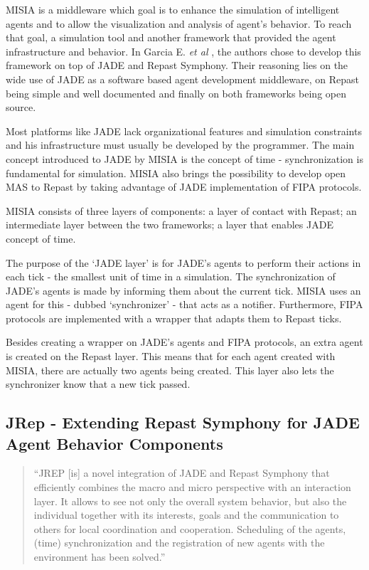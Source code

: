 	MISIA is a middleware which goal is to enhance the simulation of intelligent agents and to allow the visualization and analysis of agent's behavior. To reach that goal, a simulation tool and another framework that provided the agent infrastructure and behavior. In Garcia E. \textit{et al} \cite{garcia2011misia}, the authors chose to develop this framework on top of JADE and Repast Symphony. Their reasoning lies on the wide use of JADE as a software based agent development middleware, on Repast being simple and well documented and finally on both frameworks being open source.

	Most platforms like JADE lack organizational features and simulation constraints and his infrastructure must usually be developed by the programmer. The main concept introduced to JADE by MISIA is the concept of time - synchronization is fundamental for simulation. MISIA also brings the possibility to develop open MAS to Repast by taking advantage of JADE implementation of FIPA protocols.

	MISIA consists of three layers of components: a layer of contact with Repast; an intermediate layer between the two frameworks; a layer that enables JADE concept of time.

	The purpose of the `JADE layer' is for JADE's agents to perform their actions in each tick - the smallest unit of time in a simulation. The synchronization of JADE's agents is made by informing them about the current tick. MISIA uses an agent for this - dubbed `synchronizer' - that acts as a notifier. Furthermore, FIPA protocols are implemented with a wrapper that adapts them to Repast ticks.

	Besides creating a wrapper on JADE's agents and FIPA protocols, an extra agent is created on the Repast layer. This means that for each agent created with MISIA, there are actually two agents being created. This layer also lets the synchronizer know that a new tick passed.

\subsection{
	JRep - Extending Repast Symphony for JADE Agent Behavior Components}
\begin{quote}
	``JREP [is] a novel integration of JADE and Repast Symphony that efficiently combines the macro and micro perspective with an interaction layer. It allows to see not only the overall system behavior, but also the individual together with its interests, goals and the communication to
	others for local coordination and cooperation. Scheduling of the agents, (time) synchronization and the registration of new agents with the environment has been solved.'' \cite{gormer2011jrep}
\end{quote}

